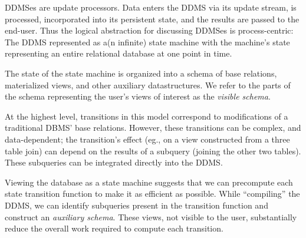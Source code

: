 

DDMSes are update processors.  Data enters the DDMS via its update stream, is
processed, incorporated into its persistent state, and the results are passed to
the end-user.  Thus the logical abstraction for discussing DDMSes is
process-centric\cite{demers-sigmod:07}: The DDMS represented as a(n infinite)
state machine with the machine's state representing an entire relational
database at one point in time.


The state of the state machine is organized into a schema of base relations,
materialized views, and other auxiliary datastructures.  We refer to the parts
of the schema representing the user's views of interest as the \textit{visible
schema}.


At the highest level, transitions in this model correspond to modifications of a
traditional DBMS' base relations.  However, these transitions can be complex,
and data-dependent; the transition's effect (eg., on a view constructed from a
three table join) can depend on the results of a subquery (joining the other two
tables).  These subqueries can be integrated directly into the DDMS.




Viewing the database as a state machine suggests that we can precompute each
state transition function to make it as efficient as possible.  While
``compiling'' the DDMS, we can identify subqueries present in the transition
function and construct an \textit{auxiliary schema}.  These views, not visible
to the user, substantially reduce the overall work required to compute each
transition.


